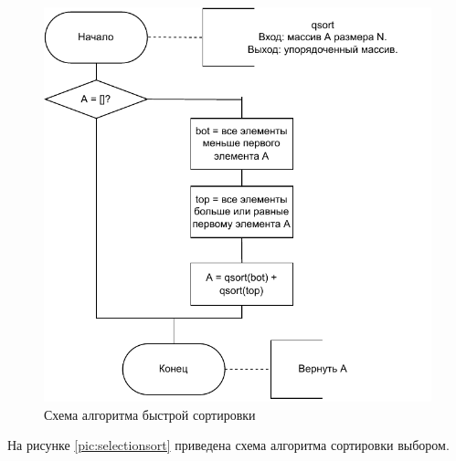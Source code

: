 \begin{figure}[H]
	\centering
	\includegraphics[scale=0.62]{assets/quicksort.pdf}
	\caption{Схема алгоритма быстрой сортировки}
	\label{pic:quicksort}
\end{figure}

\newpage

На рисунке \ref{pic:selectionsort} приведена схема алгоритма сортировки выбором.

